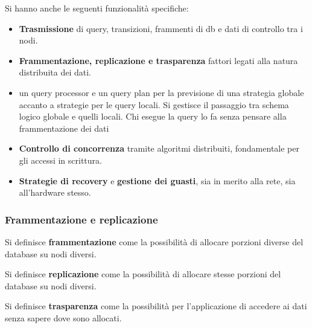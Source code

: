 Si hanno anche le seguenti funzionalità specifiche:
\begin{itemize}
    \item \textbf{Trasmissione} di query, transizioni, frammenti di db e dati
          di controllo tra i nodi.
    \item \textbf{Frammentazione, replicazione e trasparenza} fattori legati
          alla natura distribuita dei dati.
    \item un query processor e un query plan per la previsione di una
          strategia globale accanto a strategie per le query locali. Si gestisce
          il passaggio tra schema logico globale e quelli locali. Chi esegue
          la query lo fa senza pensare alla frammentazione dei dati
    \item \textbf{Controllo di concorrenza} tramite algoritmi distribuiti, fondamentale
          per gli accessi in scrittura.
    \item \textbf{Strategie di recovery} e \textbf{gestione dei guasti}, sia
          in merito alla rete, sia all'hardware stesso.
\end{itemize}

\subsubsection{Frammentazione e replicazione}
\begin{definizione}
    Si definisce \textbf{frammentazione} come la possibilità di allocare porzioni
    diverse del database su nodi diversi.
\end{definizione}
\begin{definizione}
    Si definisce \textbf{replicazione} come la possibilità di allocare stesse
    porzioni del database su nodi diversi.
\end{definizione}
\begin{definizione}
    Si definisce \textbf{trasparenza} come la possibilità per l'applicazione di
    accedere ai dati senza sapere dove sono allocati.
\end{definizione}
